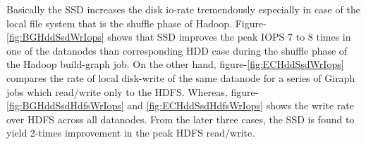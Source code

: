 \documentclass[conference]{IEEEtran}
\begin{document}
Basically the SSD increases the disk io-rate tremendously especially in case of the local file system that is the shuffle phase of Hadoop.
Figure-\ref{fig:BGHddSsdWrIops} shows that SSD improves the peak IOPS 7 to 8 times in one of the datanodes than corresponding HDD case during the shuffle phase of the Hadoop build-graph job.
On the other hand, figure-\ref{fig:ECHddSsdWrIops} compares the rate of local disk-write of the same datanode for a series of Giraph jobs which read/write only to the HDFS.
Whereas, figure-\ref{fig:BGHddSsdHdfsWrIops} and  \ref{fig:ECHddSsdHdfsWrIops} shows the write rate over HDFS across all datanodes.
From the later three cases, the SSD is found to yield 2-times improvement in the peak HDFS read/write.


\end{document}
